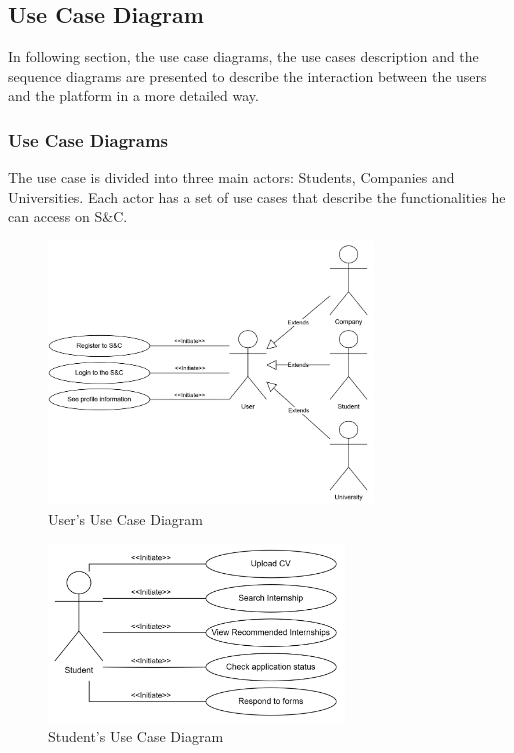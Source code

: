 \subsection{Use Case Diagram}
In following section, the use case diagrams, the use cases description and the sequence diagrams are presented to describe 
the interaction between the users and the platform in a more detailed way.

\subsubsection{Use Case Diagrams}
The use case is divided into three main actors: Students, Companies and Universities. Each actor has a set of use cases that
describe the functionalities he can access on S\&C.
\begin{figure}[H]
    \centering
    \includegraphics[width=0.77\textwidth]{Images/Use_Case_Diagrams/User_diagram.png}
    \caption{User's Use Case Diagram}
\end{figure}
\begin{figure}[H]
    \centering
    \includegraphics[width=0.7\textwidth]{Images/Use_Case_Diagrams/Student_diagram.png}
    \caption{Student's Use Case Diagram}
\end{figure}
